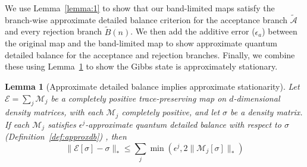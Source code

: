 \documentclass[aps,floatfix,10pt,amssymb,amsfont,amsmath,superscriptaddress,float,nofootinbib,longbibliography,nobalancelastpage,twocolumn]{revtex4-2}
\newtheorem{lemma}{Lemma}
\begin{document}
We use Lemma~\ref{lemma:1} to show that our band-limited maps satisfy the branch-wise approximate detailed balance
criterion for the acceptance branch $\tilde{\mathcal{A}}$ and every rejection branch $\tilde{B}(n)$. We then add the additive error ($\epsilon_a$) between the original map and the band-limited map to show approximate quantum detailed balance for the acceptance and rejection branches. Finally, we combine these using Lemma~\ref{theorem:quantumapproximatedeatildedbalance} to show the Gibbs state is approximately stationary.
\begin{lemma}[Approximate detailed balance implies approximate stationarity]
\label{theorem:quantumapproximatedeatildedbalance}
Let $\mathcal{E} = \sum_j \mathcal{M}_j$ be a completely positive trace-preserving map on $d$-dimensional density matrices, with each $\mathcal{M}_j$ completely positive, and let $\sigma$ be a density matrix. If each $\mathcal{M}_j$ satisfies $\epsilon^j$-approximate quantum detailed balance with respect to $\sigma$ (Definition~\ref{def:approxdb}) , then
\begin{equation}
     \|\mathcal{E}[\sigma]-\sigma\|_* \leq \sum_j\min\left(\epsilon^j, 2\|\mathcal{M}_j[\sigma]\|_*\right)
\end{equation}
\end{lemma}
\end{document}
